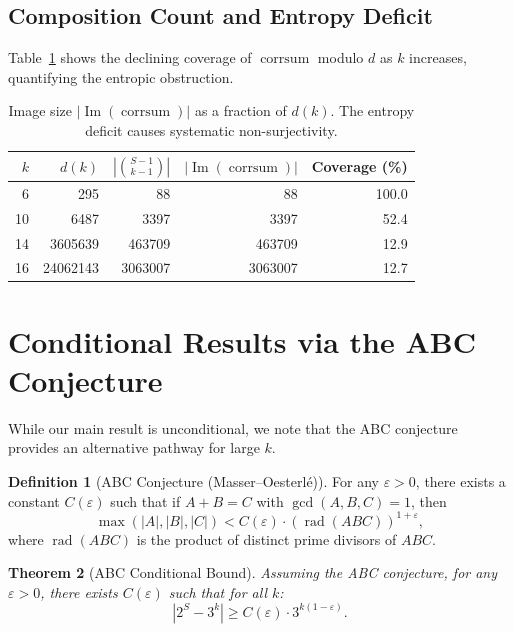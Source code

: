 \documentclass[12pt,a4paper]{amsart}
\theoremstyle{plain}
\newtheorem{theorem}{Theorem}[section]
\theoremstyle{definition}
\newtheorem{definition}[theorem]{Definition}
\newcommand{\corrsum}{\operatorname{corrsum}}
\renewcommand{\gcd}{\operatorname{gcd}}
\renewcommand{\Im}{\operatorname{Im}}
\begin{document}
\subsection{Composition Count and Entropy Deficit}

Table~\ref{tab:entropy} shows the declining coverage of $\corrsum$ modulo $d$ as $k$ increases, quantifying the entropic obstruction.

\begin{table}[h!]
\centering
\begin{tabular}{@{}rrrrr@{}}
\toprule
$k$ & $d(k)$ & $|\binom{S-1}{k-1}|$ & $|\Im(\corrsum)|$ & Coverage (\%) \\
\midrule
6 & 295 & 88 & 88 & 100.0 \\
10 & 6487 & 3397 & 3397 & 52.4 \\
14 & 3605639 & 463709 & 463709 & 12.9 \\
16 & 24062143 & 3063007 & 3063007 & 12.7 \\
\bottomrule
\end{tabular}
\caption{Image size $|\Im(\corrsum)|$ as a fraction of $d(k)$. The entropy deficit causes systematic non-surjectivity.}
\label{tab:entropy}
\end{table}

\section{Conditional Results via the ABC Conjecture}
\label{sec:abc}

While our main result is unconditional, we note that the ABC conjecture provides an alternative pathway for large $k$.

\begin{definition}[ABC Conjecture (Masser--Oesterlé)]
For any $\varepsilon > 0$, there exists a constant $C(\varepsilon)$ such that if $A + B = C$ with $\gcd(A,B,C) = 1$, then
\[
\max(|A|, |B|, |C|) < C(\varepsilon) \cdot (\operatorname{rad}(ABC))^{1+\varepsilon},
\]
where $\operatorname{rad}(ABC)$ is the product of distinct prime divisors of $ABC$.
\end{definition}

\begin{theorem}[ABC Conditional Bound]
\label{thm:abc_conditional}
Assuming the ABC conjecture, for any $\varepsilon > 0$, there exists $C(\varepsilon)$ such that for all $k$:
\[
|2^S - 3^k| \geq C(\varepsilon) \cdot 3^{k(1-\varepsilon)}.
\]
\end{theorem}
\end{document}
